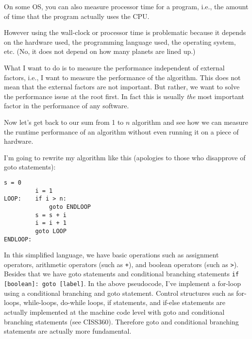 On some OS, you can also measure processor time for a program, i.e.,
the amount of time that the program actually uses the CPU.

However using the wall-clock or processor time
is problematic because
it depends on the hardware used,
the programming language used,
the operating system, etc.
(No, it does not depend on how many planets are lined up.)

What I want to do is to measure the performance independent of 
external factors, i.e., I want to measure the performance of the 
algorithm.
This does not mean that the external factors are not important.
But rather, we want to solve the performance issue at the root first.
In fact this is usually \textit{the} most important factor in the 
performance of any software.

Now let's get back to our 
sum from 1 to $n$ algorithm and see how we can measure the 
runtime performance of an algorithm without even running it on a piece of
hardware.

I'm going to rewrite my algorithm like this (apologies
to those who disapprove of goto statements):
\begin{samepage}
\begin{Verbatim}[frame=single,fontsize=\footnotesize]
         s = 0                     
         i = 1                     
LOOP:    if i > n:                  
             goto ENDLOOP          
         s = s + i                 
         i = i + 1                 
         goto LOOP                 
ENDLOOP:
\end{Verbatim}
\end{samepage}
In this simplified language, we have basic operations
such as assignment operators, arithmetic operators (such as \verb!+!),
and boolean operators (such as \verb!>!).
Besides that we have goto statements and
conditional branching statements
\verb!if [boolean]: goto [label]!.
In the above pseudocode, I've implement a for-loop using
a conditional branching and goto statement.
Control structures such as for-loops, while-loops, do-while loops,
if statements, 
and if-else statements are actually implemented at the machine code level
with goto and conditional branching statements (see CISS360).
Therefore goto and conditional branching statements are actually
more fundamental.

